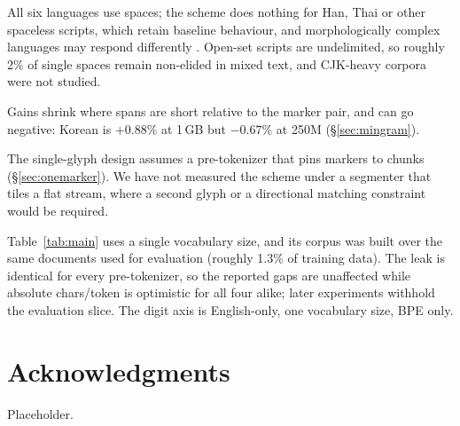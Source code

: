 \documentclass[11pt]{article}
\begin{document}
All six languages use spaces; the scheme does nothing for Han, Thai or other spaceless
scripts, which retain baseline behaviour, and morphologically complex languages may respond
differently \citep{arnett-bergen-2025-language,vemula-etal-2025-rethinking}. Open-set
scripts are undelimited, so roughly 2\% of single spaces remain non-elided in mixed text,
and CJK-heavy corpora were not studied.

Gains shrink where spans are short relative to the marker pair, and can go negative: Korean
is $+0.88\%$ at 1\,GB but $-0.67\%$ at 250M (\S\ref{sec:mingram}).

The single-glyph design assumes a pre-tokenizer that pins markers to chunks
(\S\ref{sec:onemarker}). We have not measured the scheme under a segmenter that tiles a flat
stream, where a second glyph or a directional matching constraint would be required.

Table~\ref{tab:main} uses a single vocabulary size, and its corpus was built over the same
documents used for evaluation (roughly 1.3\% of training data). The leak is identical for
every pre-tokenizer, so the reported gaps are unaffected while absolute chars/token is
optimistic for all four alike; later experiments withhold the evaluation slice. The digit
axis is English-only, one vocabulary size, BPE only.

\section*{Acknowledgments}

Placeholder.


\end{document}
